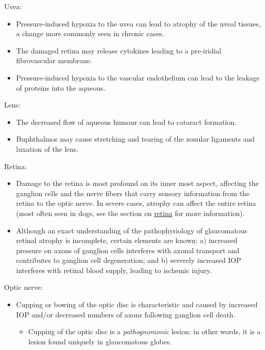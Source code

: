 \documentclass[
  openany]{article}
\providecommand{\tightlist}{%
  \setlength{\itemsep}{0pt}\setlength{\parskip}{0pt}}
\begin{document}
Uvea:

\begin{itemize}
\tightlist
\item
  Pressure-induced hypoxia to the uvea can lead to atrophy of the uveal tissues, a change more commonly seen in chronic cases.
\item
  The damaged retina may release cytokines leading to a pre-iridial fibrovascular membrane.
\item
  Pressure-induced hypoxia to the vascular endothelium can lead to the leakage of proteins into the aqueous.
\end{itemize}

Lens:

\begin{itemize}
\tightlist
\item
  The decreased flow of aqueous humour can lead to cataract formation.
\item
  Buphthalmos may cause stretching and tearing of the zonular ligaments and luxation of the lens.
\end{itemize}

Retina:

\begin{itemize}
\tightlist
\item
  Damage to the retina is most profound on its inner most aspect, affecting the ganglion cells and the nerve fibers that carry sensory information from the retina to the optic nerve. In severe cases, atrophy can affect the entire retina (most often seen in dogs, see the section on \protect\hyperlink{pathology-of-the-retina}{retina} for more information).
\item
  Although an exact understanding of the pathophysiology of glaucomatous retinal atrophy is incomplete, certain elements are known: a) increased pressure on axons of ganglion cells interferes with axonal transport and contributes to ganglion cell degeneration; and b) severely increased IOP interferes with retinal blood supply, leading to ischemic injury.
\end{itemize}

Optic nerve:

\begin{itemize}
\tightlist
\item
  Cupping or bowing of the optic disc is characteristic and caused by increased IOP and/or decreased numbers of axons following ganglion cell death.

  \begin{itemize}
  \tightlist
  \item
    Cupping of the optic disc is a \emph{pathognomonic} lesion: in other words, it is a lesion found uniquely in glaucomatous globes.
  \end{itemize}
\end{itemize}
\end{document}
